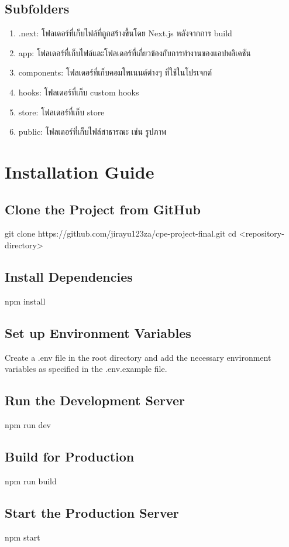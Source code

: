     \subsection{Subfolders}
    \begin{enumerate}
       \item .next: โฟลเดอร์ที่เก็บไฟล์ที่ถูกสร้างขึ้นโดย Next.js หลังจากการ build
       \item app: โฟลเดอร์ที่เก็บไฟล์และโฟลเดอร์ที่เกี่ยวข้องกับการทํางานของแอปพลิเคชัน
       \item components: โฟลเดอร์ที่เก็บคอมโพเนนต์ต่างๆ ที่ใช้ในโปรเจกต์
       \item hooks: โฟลเดอร์ที่เก็บ custom hooks 
       \item store: โฟลเดอร์ที่เก็บ store
       \item public: โฟลเดอร์ที่เก็บไฟล์สาธารณะ เช่น รูปภาพ
    \end{enumerate}
\section{Installation Guide}
  \subsection{Clone the Project from GitHub}
    \qquad git clone https://github.com/jirayu123za/cpe-project-final.git
cd <repository-directory>
  \subsection{Install Dependencies}
    \qquad npm install
  \subsection{Set up Environment Variables}
    \qquad Create a .env file in the root directory and add the necessary environment variables as specified in the .env.example file.
  \subsection{Run the Development Server}
    \qquad npm run dev
  \subsection{Build for Production}
    \qquad npm run build
  \subsection{Start the Production Server}
    \qquad npm start
